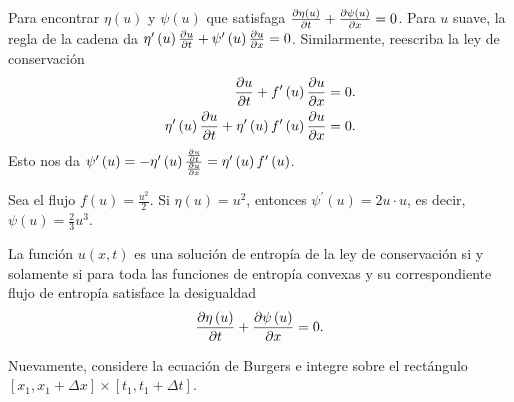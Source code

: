 Para encontrar $\eta\left(u\right)$ y $\psi\left(u\right)$ que satisfaga
\begin{math}
	\diffp{\eta\left(u\right)}{t}+
	\diffp{\psi\left(u\right)}{x}=0
\end{math}.
Para $u$ suave, la regla de la cadena da
\begin{math}
	\eta^{\prime}
	\left(u\right)
	\diffp{u}{t}+
	\psi^{\prime}\left(u\right)
	\diffp{u}{x}=
	0
\end{math}.
Similarmente, reescriba la ley de conservación
\begin{align*}
	\diffp{u}{t}+
	f^{\prime}\left(u\right)
	\diffp{u}{x} & =0. \\
	\eta^{\prime}\left(u\right)
	\diffp{u}{t}+
	\eta^{\prime}\left(u\right)
	f^{\prime}\left(u\right)
	\diffp{u}{x} & =
	0.
\end{align*}
Esto nos da
\begin{math}
	\psi^{\prime}
	\left(u\right)=
	-\eta^{\prime}
	\left(u\right)
	\frac{\diffp{u}{t}}{\diffp{u}{x}}=
	\eta^{\prime}\left(u\right)
	f^{\prime}\left(u\right)
\end{math}.

\begin{example}
	Sea el flujo $f\left(u\right)=\frac{u^{2}}{2}$.
	Si $\eta\left(u\right)=u^{2}$, entonces
	$\psi^{\prime}\left(u\right)=2u\cdot u$, es decir,
	$\psi\left(u\right)=\frac{2}{3}u^{3}$.
\end{example}

\begin{definition}
	La función $u\left(x,t\right)$ es una solución de entropía
	de la ley de conservación si y solamente si
	para toda las funciones de entropía convexas y su correspondiente flujo de entropía
	satisface la desigualdad
	\begin{equation*}
		\diffp{\eta\left(u\right)}{t}+
		\diffp{\psi\left(u\right)}{x}=
		0.
	\end{equation*}
\end{definition}

Nuevamente, considere la ecuación de Burgers e integre sobre el rectángulo
$\left[x_{1},x_{1}+\Delta x\right]\times\left[t_{1},t_{1}+\Delta t\right]$.

